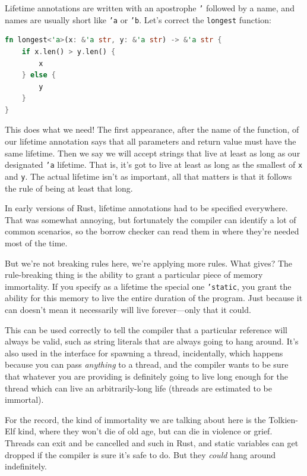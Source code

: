 \documentclass[a4paper]{report}
\begin{document}
Lifetime annotations are written with an apostrophe \texttt{'} followed by a name, and names are usually short like \texttt{'a} or \texttt{'b}. Let's correct the \texttt{longest} function:

\begin{lstlisting}[language=Rust]
fn longest<'a>(x: &'a str, y: &'a str) -> &'a str {
    if x.len() > y.len() {
        x
    } else {
        y
    }
}
\end{lstlisting}

This does what we need! The first appearance, after the name of the function, of our lifetime annotation says that all parameters and return value must have the same lifetime. Then we say we will accept strings that live at least as long as our designated \texttt{'a} lifetime. That is, it's got to live at least as long as the smallest of \texttt{x} and \texttt{y}. The actual lifetime isn't as important, all that matters is that it follows the rule of being at least that long.

In early versions of Rust, lifetime annotations had to be specified everywhere. That was somewhat annoying, but fortunately the compiler can identify a lot of common scenarios, so the borrow checker can read them in where they're needed most of the time.


But we're not breaking rules here, we're applying more rules. What gives? The rule-breaking thing is the ability to grant a particular piece of memory immortality. If you specify as a lifetime the special one \texttt{'static}, you grant the ability for this memory to live the entire duration of the program. Just because it can doesn't mean it necessarily will live forever---only that it could. 

This can be used correctly to tell the compiler that a particular reference will always be valid, such as string literals that are always going to hang around. It's also used in the interface for spawning a thread, incidentally, which happens because you can pass \textit{anything} to a thread, and the compiler wants to be sure that whatever you are providing is definitely going to live long enough for the thread which can live an arbitrarily-long life (threads are estimated to be immortal). 

For the record, the kind of immortality we are talking about here is the Tolkien-Elf kind, where they won't die of old age, but can die in violence or grief. Threads can exit and be cancelled and such in Rust, and static variables can get dropped if the compiler is sure it's safe to do. But they \textit{could} hang around indefinitely.
\end{document}
